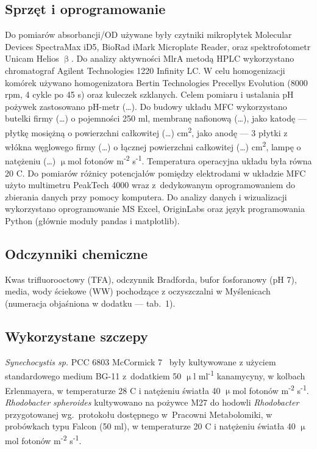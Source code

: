 \subsection{Sprzęt i oprogramowanie}\label{subsec:sprzet}
Do pomiarów absorbancji/OD używane były czytniki mikropłytek
Molecular Devices SpectraMax iD5, BioRad iMark
Microplate Reader, oraz spektrofotometr Unicam Helios $\upbeta$.
Do analizy aktywności MlrA metodą HPLC wykorzystano chromatograf
Agilent Technologies 1220 Infinity LC\@.
W celu homogenizacji komórek używano homogenizatora
Bertin Technologies Precellys Evolution (8000 rpm, 4 cykle po 45 s)
oraz kuleczek szklanych.
Celem pomiaru i ustalania pH pożywek zastosowano pH-metr (\ldots).
Do budowy układu MFC wykorzystano butelki firmy (\ldots)
o pojemności 250 ml, membranę nafionową (\ldots),
jako katodę — płytkę mosiężną o powierzchni całkowitej (\ldots)
cm\textsuperscript{2}, jako anodę — 3 płytki z włókna węglowego firmy
(\ldots) o łącznej powierzchni całkowitej (\ldots) cm\textsuperscript{2},
lampę o natężeniu (\ldots) $\upmu$mol fotonów m\textsuperscript{-2} s\textsuperscript{-1}.
Temperatura operacyjna układu była równa 20 \degree C\@.
Do pomiarów różnicy potencjałów pomiędzy elektrodami
w układzie MFC użyto multimetru PeakTech 4000 wraz
z~dedykowanym oprogramowaniem do zbierania danych przy pomocy komputera.
Do analizy danych i wizualizacji wykorzystano oprogramowanie
MS Excel, OriginLabs oraz język programowania Python
(głównie moduły pandas i matplotlib).

\subsection{Odczynniki chemiczne}\label{subsec:odczynniki}
Kwas trifluorooctowy (TFA), odczynnik Bradforda, bufor fosforanowy (pH 7),
media, wody ściekowe (WW) pochodzące z oczyszczalni w Myślenicach
(numeracja objaśniona w dodatku — tab.\ 1).

\subsection{Wykorzystane szczepy}\label{subsec:szczepy}
\textit{Synechocystis sp.} PCC 6803 McCormick 7~\cite{Puchalski2021}
były kultywowane z użyciem standardowego medium BG-11 z~dodatkiem 50
$\upmu$l ml\textsuperscript{-1} kanamycyny, w kolbach Erlenmayera,
w temperaturze 28 \degree C i natężeniu światła
40 $\upmu$mol fotonów m\textsuperscript{-2} s\textsuperscript{-1}.
\textit{Rhodobacter spheroides} kultywowano na pożywce M27
do hodowli \textit{Rhodobacter} przygotowanej wg.\ protokołu
dostępnego w~Pracowni Metabolomiki, w probówkach typu
Falcon (50 ml), w temperaturze 20 \degree C i natężeniu światła
40 $\upmu$mol fotonów m\textsuperscript{-2} s\textsuperscript{-1}.

